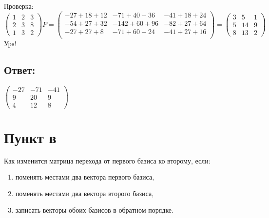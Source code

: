 \documentclass[12pt]{article}
\begin{document}
    Проверка:
    \[
        \begin{pmatrix}
            1 & 2 & 3 \\
            2 & 3 & 8 \\
            1 & 3 & 2
        \end{pmatrix}
        P
        =
        \begin{pmatrix}
            -27 + 18 + 12 & -71 + 40 + 36  & -41 + 18 + 24 \\
            -54 + 27 + 32 & -142 + 60 + 96 & -82 + 27 + 64 \\
            -27 + 27 + 8  & -71 + 60 + 24  & -41 + 27 + 16 \\
        \end{pmatrix}
        =
        \begin{pmatrix}
            3 & 5  & 1 \\
            5 & 14 & 9 \\
            8 & 13 & 2
        \end{pmatrix}
    \]
    Ура!

    \subsection*{Ответ:}
    $
    \begin{pmatrix}
        -27 & -71 & -41 \\
        9   & 20  & 9   \\
        4   & 12  & 8
    \end{pmatrix}
    $

    \section*{Пункт в}
    Как изменится матрица перехода от первого базиса ко второму, если:
    \begin{enumerate}
        \item поменять местами два вектора первого базиса,
        \item поменять местами два вектора второго базиса,
        \item записать векторы обоих базисов в обратном порядке.
    \end{enumerate}
\end{document}
